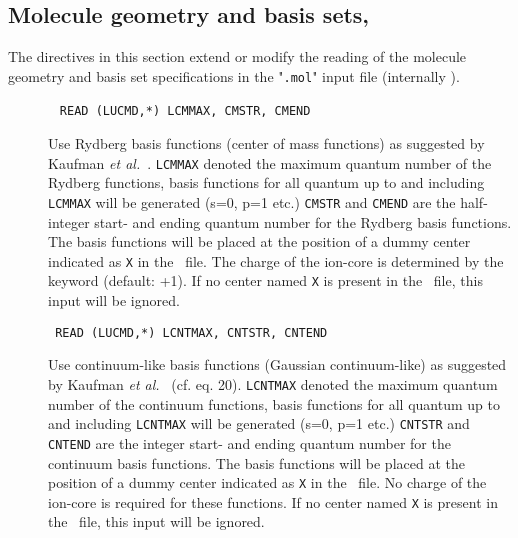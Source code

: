 \subsection{Molecule geometry and basis sets, }\label{sec:herrdn}

The directives in this section extend or modify the reading of the molecule geometry and basis set
specifications in the "\verb|.mol|" input file (internally \molinp).

\begin{description}
\item[]\verb| |\newline
\verb|READ (LUCMD,*) LCMMAX, CMSTR, CMEND|

Use Rydberg basis functions
(center of mass functions) as suggested by
Kaufman {\it et al.\/}~\cite{kkwbmjjpbamop22}. \verb|LCMMAX| denoted
the maximum quantum number of the Rydberg functions, basis functions
for all quantum up to and including \verb|LCMMAX| will be generated
(s=0, p=1 etc.) \verb|CMSTR| and \verb|CMEND| are the half-integer
start- and ending quantum number for the Rydberg basis functions. The
basis functions will be placed at the position of a dummy center
indicated as \verb|X| in the \molinp\ file. The charge of
the ion-core is determined by the keyword  (default: +1).
If no center named \verb|X| is present in the \molinp\ file,
this input will be ignored.

\item[]\verb| |\newline
\verb|READ (LUCMD,*) LCNTMAX, CNTSTR, CNTEND|

%
%
Use continuum-like basis functions
(Gaussian continuum-like) as suggested by
Kaufman {\it et al.\/}~\cite{kkwbmjjpbamop22} (cf. eq. 20). \verb|LCNTMAX| denoted
the maximum quantum number of the continuum functions, basis functions
for all quantum up to and including \verb|LCNTMAX| will be generated
(s=0, p=1 etc.) \verb|CNTSTR| and \verb|CNTEND| are the integer
start- and ending quantum number for the continuum basis functions. The
basis functions will be placed at the position of a dummy center
indicated as \verb|X| in the \molinp\ file. 
No charge of the ion-core is required for these functions.
If no center named \verb|X| is present in the \molinp\ file,
this input will be ignored.


\end{description}
